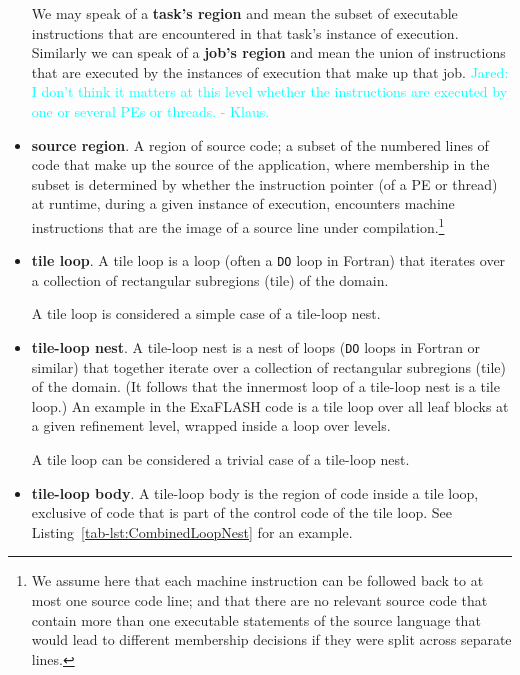 \documentclass{article}
\newcommand{\code}[1]{{\tt#1}}
\newcommand{\FlashOfTheFuture}{ExaFLASH\xspace}
\newcommand{\JaredRfromKW}[1]   {\textcolor{cyan}{Jared: #1 - Klaus.}}
\newcommand{\tileloop}               {tile loop\xspace}        %
\newcommand{\tileloopnest}           {tile-loop nest\xspace}   %
\newcommand{\tileloopbody}           {tile-loop body\xspace}   %
\begin{document}
\begin{itemize}
We may speak of a \textbf{task's region} and mean the subset of executable
instructions that are encountered in that task's instance of execution.
Similarly we can speak of a \textbf{job's region} and mean the union
of instructions that are executed by the instances of execution that
make up that job.
\JaredRfromKW{I don't think it matters at this level whether
the instructions are executed by one or several PEs or threads.}
\item \textbf{source region}.
A region of source code;
a subset of the numbered lines of code that make
up the source of the application, where membership in the subset
is determined by whether the instruction pointer (of a PE or thread) at runtime,
during a given  instance of execution,
encounters machine instructions that are the image of a source line
under compilation.\footnote{
We assume here that each machine instruction can be followed back
to at most one source code line; and that there are no relevant source code
that contain more than one
executable statements of the source language that would lead
to different membership decisions if they were split across
separate lines.}


\item \textbf{\tileloop}.
A \tileloop is a loop (often a \code{DO} loop in Fortran) that
iterates over a collection of rectangular subregions (tile) of the domain.

A \tileloop is  considered a simple case of a \tileloopnest.

\item \textbf{\tileloopnest}.
A \tileloopnest is a nest of loops (\code{DO} loops in Fortran or similar) that
together iterate over a collection of rectangular subregions (tile) of the domain.
(It follows that the innermost loop of a \tileloopnest is a \tileloop.)
An example in the \FlashOfTheFuture code is a \tileloop over all leaf blocks at a given
refinement level, wrapped inside a loop over levels.

A \tileloop can be considered a trivial case of a \tileloopnest.

\item \textbf{\tileloopbody}.
A \tileloopbody is the region of code inside a \tileloop,
exclusive of code that is part of the control code of the
\tileloop. See Listing~\ref{tab-lst:CombinedLoopNest} for an example.


\end{itemize}
\end{document}
